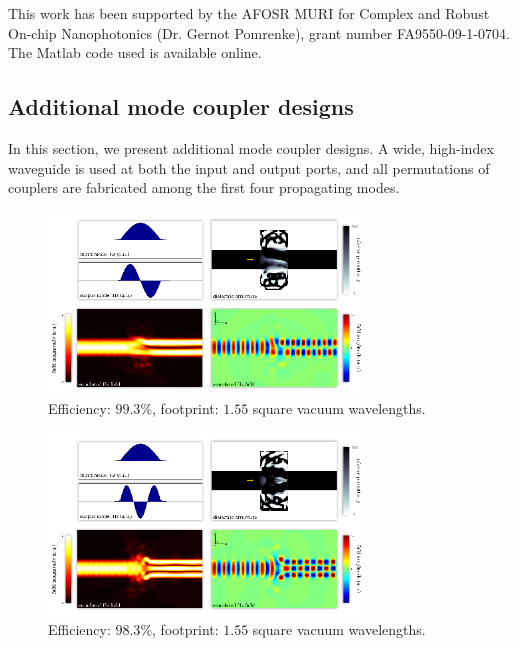 \documentclass[letterpaper,10pt]{article}
\begin{document}
This work has been supported by the 
    AFOSR MURI for Complex and Robust On-chip Nanophotonics 
    (Dr. Gernot Pomrenke), grant number FA9550-09-1-0704.
The Matlab code used is available online\cite{code}.
\clearpage
\begin{appendix}
\section{Additional mode coupler designs}
In this section, we present additional mode coupler designs.
A wide, high-index waveguide is used at both the input and output ports,
    and all permutations of couplers are fabricated among
    the first four propagating modes.
\begin{figure}[htb]
    \centering
    \includegraphics[width=0.75\textwidth]{6}
    \caption{
        Efficiency: $99.3\%$,
        footprint: $1.55$ square vacuum wavelengths.
        }
\end{figure}


\begin{figure}[htb]
    \centering
    \includegraphics[width=0.75\textwidth]{7}
    \caption{
        Efficiency: $98.3\%$,
        footprint: $1.55$ square vacuum wavelengths.
        }
\end{figure}



\end{appendix}
\end{document}
